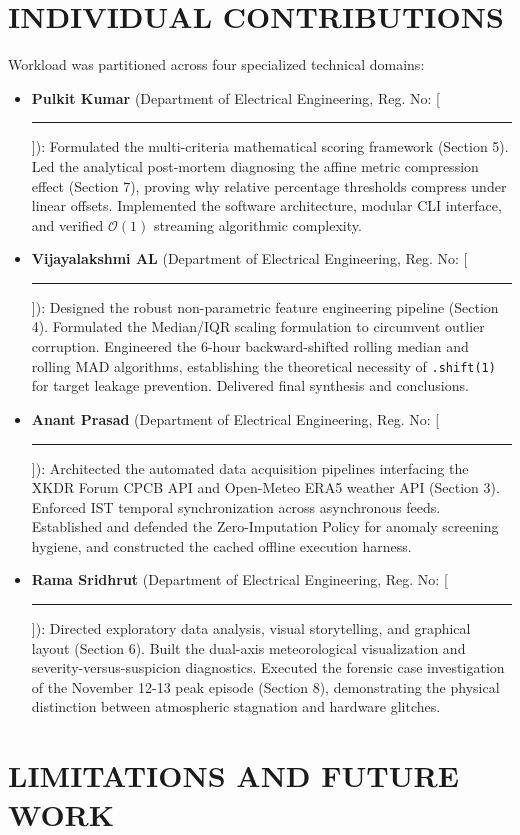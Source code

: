 \documentclass[twoside]{article}
\begin{document}
\section{INDIVIDUAL CONTRIBUTIONS}

Workload was partitioned across four specialized technical domains:
\begin{itemize}
  \setlength{\itemsep}{1.5pt}
  \item \textbf{Pulkit Kumar} (Department of Electrical Engineering, Reg. No: [\;\rule{1.8cm}{0.4pt}\;]): Formulated the multi-criteria mathematical scoring framework (Section 5). Led the analytical post-mortem diagnosing the affine metric compression effect (Section 7), proving why relative percentage thresholds compress under linear offsets. Implemented the software architecture, modular CLI interface, and verified $\mathcal{O}(1)$ streaming algorithmic complexity.
  \item \textbf{Vijayalakshmi AL} (Department of Electrical Engineering, Reg. No: [\;\rule{1.8cm}{0.4pt}\;]): Designed the robust non-parametric feature engineering pipeline (Section 4). Formulated the Median/IQR scaling formulation to circumvent outlier corruption. Engineered the 6-hour backward-shifted rolling median and rolling MAD algorithms, establishing the theoretical necessity of \texttt{.shift(1)} for target leakage prevention. Delivered final synthesis and conclusions.
  \item \textbf{Anant Prasad} (Department of Electrical Engineering, Reg. No: [\;\rule{1.8cm}{0.4pt}\;]): Architected the automated data acquisition pipelines interfacing the XKDR Forum CPCB API and Open-Meteo ERA5 weather API (Section 3). Enforced IST temporal synchronization across asynchronous feeds. Established and defended the Zero-Imputation Policy for anomaly screening hygiene, and constructed the cached offline execution harness.
  \item \textbf{Rama Sridhrut} (Department of Electrical Engineering, Reg. No: [\;\rule{1.8cm}{0.4pt}\;]): Directed exploratory data analysis, visual storytelling, and graphical layout (Section 6). Built the dual-axis meteorological visualization and severity-versus-suspicion diagnostics. Executed the forensic case investigation of the November 12-13 peak episode (Section 8), demonstrating the physical distinction between atmospheric stagnation and hardware glitches.
\end{itemize}

\section{LIMITATIONS AND FUTURE WORK}
\end{document}
